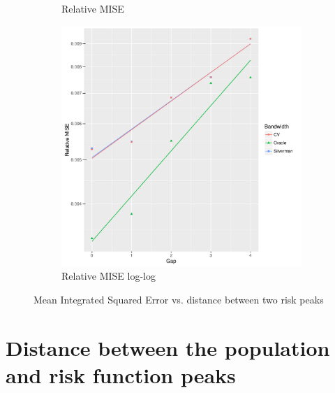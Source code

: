 \begin{figure}[htbp]
\begin{subfigure}[b]{0.3\textwidth}
    \caption{Relative MISE}
    \end{subfigure}
    \begin{subfigure}[b]{0.3\textwidth}
    \includegraphics[width=\textwidth]{results/by_two_peaks/RMISE-vs-risk-peak-gap-log-log}
    \caption{Relative MISE log-log}
    \end{subfigure}
    \caption[MISE: by risk spread]{Mean Integrated Squared Error vs. distance between two risk peaks}
    \label{fig:ise:p1.4_100_G}
\end{figure}

\section{Distance between the population and risk function peaks}
\label{sec:ise:p1.4_Gap_risk}

